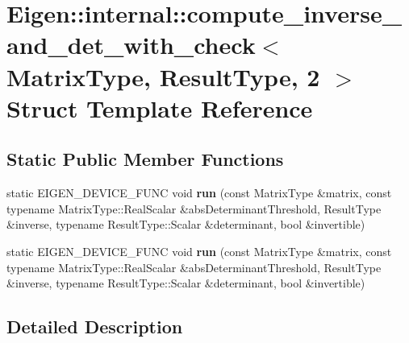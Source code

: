 \hypertarget{struct_eigen_1_1internal_1_1compute__inverse__and__det__with__check_3_01_matrix_type_00_01_result_type_00_012_01_4}{}\section{Eigen\+:\+:internal\+:\+:compute\+\_\+inverse\+\_\+and\+\_\+det\+\_\+with\+\_\+check$<$ Matrix\+Type, Result\+Type, 2 $>$ Struct Template Reference}
\label{struct_eigen_1_1internal_1_1compute__inverse__and__det__with__check_3_01_matrix_type_00_01_result_type_00_012_01_4}
\subsection*{Static Public Member Functions}
\begin{DoxyCompactItemize}
\item 
\mbox{\label{struct_eigen_1_1internal_1_1compute__inverse__and__det__with__check_3_01_matrix_type_00_01_result_type_00_012_01_4_a520ba3dc958c01e4bbcf965f1764ba90}} 
static E\+I\+G\+E\+N\+\_\+\+D\+E\+V\+I\+C\+E\+\_\+\+F\+U\+NC void {\bfseries run} (const Matrix\+Type \&matrix, const typename Matrix\+Type\+::\+Real\+Scalar \&abs\+Determinant\+Threshold, Result\+Type \&inverse, typename Result\+Type\+::\+Scalar \&determinant, bool \&invertible)
\item 
\mbox{\label{struct_eigen_1_1internal_1_1compute__inverse__and__det__with__check_3_01_matrix_type_00_01_result_type_00_012_01_4_a520ba3dc958c01e4bbcf965f1764ba90}} 
static E\+I\+G\+E\+N\+\_\+\+D\+E\+V\+I\+C\+E\+\_\+\+F\+U\+NC void {\bfseries run} (const Matrix\+Type \&matrix, const typename Matrix\+Type\+::\+Real\+Scalar \&abs\+Determinant\+Threshold, Result\+Type \&inverse, typename Result\+Type\+::\+Scalar \&determinant, bool \&invertible)
\end{DoxyCompactItemize}


\subsection{Detailed Description}
